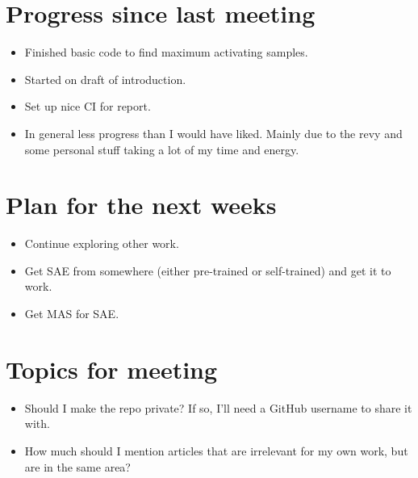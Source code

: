 \documentclass[main.tex]{subfiles}
\begin{document}
\section*{Progress since last meeting}
\begin{itemize}
    \item Finished basic code to find maximum activating samples.
    \item Started on draft of introduction.
    \item Set up nice CI for report.
    \item In general less progress than I would have liked.
    Mainly due to the revy and some personal stuff taking a lot of my time and energy.
\end{itemize}
\section*{Plan for the next weeks}
\begin{itemize}
    \item Continue exploring other work.
    \item Get SAE from somewhere (either pre-trained or self-trained) and get it to work.
    \item Get MAS for SAE.
\end{itemize}
\section*{Topics for meeting}
\begin{itemize}
    \item Should I make the repo private? If so, I'll need a GitHub username to share it with.
    \item How much should I mention articles that are irrelevant for my own work, but are in the same area?
\end{itemize}
\end{document}
